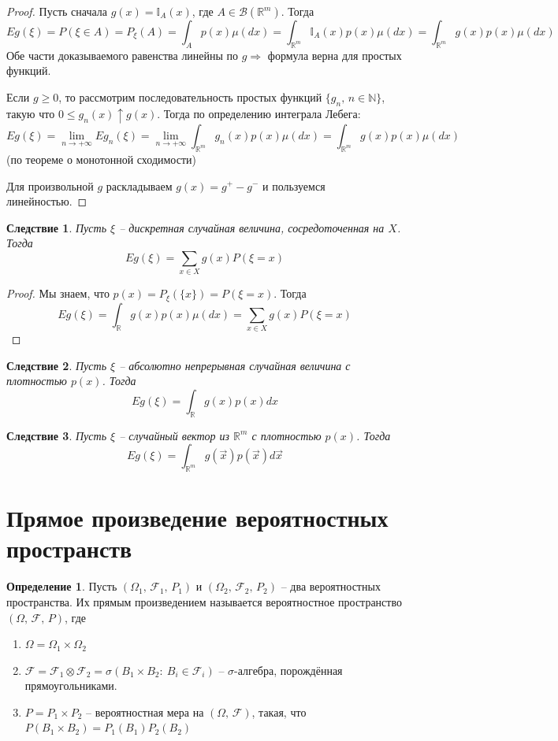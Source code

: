 \documentclass[a4paper,12pt]{article}
\renewcommand{\leq}{\ensuremath{\leqslant}}
\renewcommand{\geq}{\ensuremath{\geqslant}}
\theoremstyle{plain}
\newtheorem*{corollary}{Следствие}
\theoremstyle{definition}
\newtheorem{definition}{Определение}[section]
\theoremstyle{remark}
\begin{document}
\begin{proof}
  Пусть сначала $g(x) = \mathbb{I}_A(x)$, где $A \in \mathcal{B}(\mathbb{R}^m)$. Тогда 
  \[
    Eg(\xi) = P(\xi \in A) = P_\xi(A) = \int_Ap(x)\mu(dx) = \int_{\mathbb{R}^m}\mathbb{I}_A(x)p(x)\mu(dx) = \int_{\mathbb{R}^m}g(x)p(x)\mu(dx)
  \]
  Обе части доказываемого равенства линейны по $g \Rightarrow$ формула верна для простых функций.

  Если $g \geq 0$, то рассмотрим последовательность простых функций $\{g_n,\, n \in \mathbb{N}\}$, такую что $0 \leq g_n(x) \uparrow g(x)$. Тогда по определению интеграла Лебега:
  \[
    Eg(\xi) = \lim_{n \to +\infty}Eg_n(\xi) = \lim_{n \to +\infty} \int_{\mathbb{R}^m}g_n(x)p(x)\mu(dx) = \int_{\mathbb{R}^m}g(x)p(x)\mu(dx)
  \]
  (по теореме о монотонной сходимости)

  Для произвольной $g$ раскладываем $g(x) = g^+ - g^-$ и пользуемся линейностью.
\end{proof}

\begin{corollary}
  Пусть $\xi$ -- дискретная случайная величина, сосредоточенная на $X$. Тогда
  \[Eg(\xi) = \sum_{x \in X}g(x)P(\xi = x)\]
\end{corollary}

\begin{proof}
  Мы знаем, что $p(x) = P_\xi(\{x\}) = P(\xi = x)$. Тогда
  \[Eg(\xi) = \int_\mathbb{R}g(x)p(x)\mu(dx) = \sum_{x \in X} g(x)P(\xi = x)\]
\end{proof}

\begin{corollary}
  Пусть $\xi$ -- абсолютно непрерывная случайная величина с плотностью $p(x)$. Тогда
  \[Eg(\xi) = \int_\mathbb{R} g(x)p(x)dx\]
\end{corollary}

\begin{corollary}
  Пусть $\xi$ -- случайный вектор из $\mathbb{R}^m$ с плотностью $p(x)$. Тогда
  \[Eg(\xi) = \int_{\mathbb{R}^m}g(\vec{x})p(\vec{x})d\vec{x}\]
\end{corollary}

\section{Прямое произведение вероятностных пространств}
\begin{definition}
  Пусть $(\Omega_1,\, \mathcal{F}_1,\, P_1)$ и $(\Omega_2,\, \mathcal{F}_2,\, P_2)$ -- два вероятностных пространства. Их прямым произведением называется вероятностное пространство $(\Omega,\, \mathcal{F},\, P)$, где
  \begin{enumerate}
    \item $\Omega = \Omega_1 \times \Omega_2$
    \item $\mathcal{F} = \mathcal{F}_1 \otimes \mathcal{F}_2 = \sigma(B_1 \times B_2:\: B_i \in \mathcal{F}_i)$ -- $\sigma$-алгебра, порождённая прямоугольниками.
    \item $P = P_1 \times P_2$ -- вероятностная мера на $(\Omega,\, \mathcal{F})$, такая, что $P(B_1 \times B_2) = P_1(B_1)P_2(B_2)$
  \end{enumerate} 
\end{definition}
\end{document}
